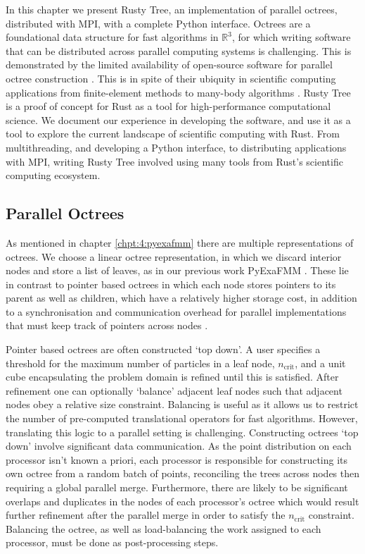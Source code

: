 In this chapter we present Rusty Tree, an implementation of parallel octrees, distributed with MPI, with a complete Python interface. Octrees are a foundational data structure for fast algorithms in $\mathbb{R}^3$, for which writing software that can be distributed across parallel computing systems is challenging. This is demonstrated by the limited availability of open-source software for parallel octree construction \cite{BursteddeWilcoxGhattas11,fernando2020github}. This is in spite of their ubiquity in scientific computing applications from finite-element methods to many-body algorithms \cite{sundar2008bottom}. Rusty Tree is a proof of concept for Rust as a tool for high-performance computational science. We document our experience in developing the software, and use it as a tool to explore the current landscape of scientific computing with Rust. From multithreading, and developing a Python interface, to distributing applications with MPI, writing Rusty Tree involved using many tools from Rust's scientific computing ecosystem. 

\subsection*{Parallel Octrees}

As mentioned in chapter \ref{chpt:4:pyexafmm} there are multiple representations of octrees. We choose a linear octree representation, in which we discard interior nodes and store a list of leaves, as in our previous work PyExaFMM \cite{kailasa2022pyexafmm}. These lie in contrast to pointer based octrees in which each node stores pointers to its parent as well as children, which have a relatively higher storage cost, in addition to a synchronisation and communication overhead for parallel implementations that must keep track of pointers across nodes \cite{tu2005scalable}. 

Pointer based octrees are often constructed `top down'. A user specifies a threshold for the maximum number of particles in a leaf node, $n_{\text{crit}}$, and a unit cube encapsulating the problem domain is refined until this is satisfied. After refinement one can optionally `balance' adjacent leaf nodes such that adjacent nodes obey a relative size constraint. Balancing is useful as it allows us to restrict the number of pre-computed translational operators for fast algorithms. However, translating this logic to a parallel setting is challenging. Constructing octrees `top down' involve significant data communication. As the point distribution on each processor isn't known a priori, each processor is responsible for constructing its own octree from a random batch of points, reconciling the trees across nodes then requiring a global parallel merge. Furthermore, there are likely to be significant overlaps and duplicates in the nodes of each processor's octree which would result further refinement after the parallel merge in order to satisfy the $n_{\text{crit}}$ constraint. Balancing the octree, as well as load-balancing the work assigned to each processor, must be done as post-processing steps.

